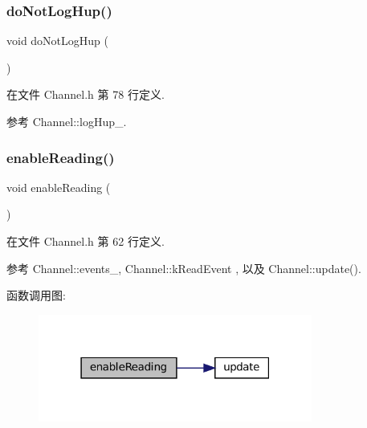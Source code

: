 \subsubsection{\texorpdfstring{do\+Not\+Log\+Hup()}{doNotLogHup()}}
{\footnotesize\ttfamily void do\+Not\+Log\+Hup (\begin{DoxyParamCaption}{ }\end{DoxyParamCaption})\hspace{0.3cm}{\ttfamily [inline]}}



在文件 Channel.\+h 第 78 行定义.



参考 Channel\+::log\+Hup\+\_\+.

\mbox{\label{classmuduo_1_1net_1_1Channel_ad31f735a6d5ad83203d977ad8eafb223}} 
\subsubsection{\texorpdfstring{enable\+Reading()}{enableReading()}}
{\footnotesize\ttfamily void enable\+Reading (\begin{DoxyParamCaption}{ }\end{DoxyParamCaption})\hspace{0.3cm}{\ttfamily [inline]}}



在文件 Channel.\+h 第 62 行定义.



参考 Channel\+::events\+\_\+, Channel\+::k\+Read\+Event , 以及 Channel\+::update().

函数调用图\+:
\nopagebreak
\begin{figure}[H]
\begin{center}
\leavevmode
\includegraphics[width=255pt]{classmuduo_1_1net_1_1Channel_ad31f735a6d5ad83203d977ad8eafb223_cgraph}
\end{center}
\end{figure}
\mbox{\label{classmuduo_1_1net_1_1Channel_af1dff4317f202ed06097a1425a4dca6d}} 
